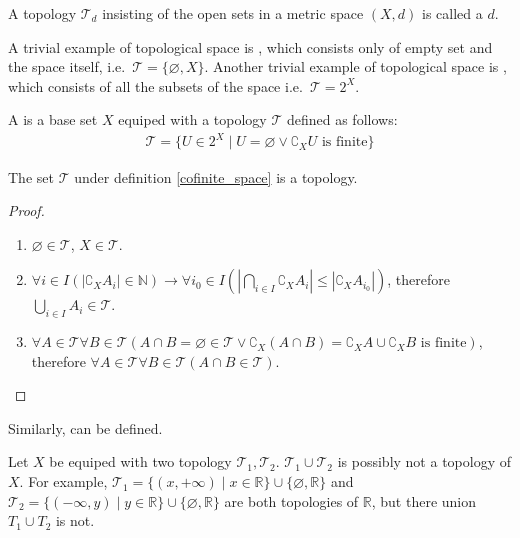 \documentclass[openany]{book}
\begin{document}
\begin{definition}\label{induced_topology}
A topology $\mathscr{T}_d$ insisting of the open sets in a metric space $( X, d)$ is called a  $d$.
\end{definition}

A trivial example of topological space is , which consists only of empty set and the space itself, i.e.\ $\mathscr{T}=\{\varnothing, X\}$. Another trivial example of topological space is , which consists of all the subsets of the space i.e.\ $\mathscr{T} = 2^X$.

A  is a base set $X$ equiped with a topology $\mathscr{T}$ defined as follows:
\begin{align}\label{cofinite_space}
	\mathscr{T} = \{ U\in 2^X\mid U=\varnothing \vee \complement_X U \text{ is finite} \}
\end{align}
\begin{proposition}
The set $\mathscr{T}$ under definition \ref{cofinite_space} is a topology.
\end{proposition}
\begin{proof}
\begin{enumerate}[label=\alph*)]
\item $\varnothing \in \mathscr{T}$, $X\in\mathscr T$.
\item $\forall i \in I \left(
	\left|\complement_X  A_i\right| \in \mathbb N\right) \to
		\forall i_0\in I\left(
			\left| \bigcap_{i\in I} \complement_X A_i\right| \leq 
				\left|\complement_X A_{i_0}\right|\right)$, therefore $\bigcup_{i\in I}  A_i \in \mathscr T$.
\item $\forall A\in \mathscr T \forall B \in \mathscr T(
	A\cap B=\varnothing\in \mathscr{T} \vee
		\complement_X (A\cap B) = \complement_X A\cup \complement_X B \text{ is finite} )$, 
	therefore $\forall A\in \mathscr T \forall B \in \mathscr T(
		A\cap B \in \mathscr T)$.
\end{enumerate}
\end{proof}

Similarly,  can be defined.

Let $X$ be equiped with two topology $\mathscr T_1, \mathscr T_2$. $\mathscr T_1\cup \mathscr T_2$ is possibly not a topology of $X$. For example, $\mathscr T _1 = \{ (x,+\infty) \mid x\in\mathbb R\}\cup\{ \varnothing,\mathbb R\}$ and $\mathscr T_2 = \{ (-\infty, y) \mid y\in\mathbb R\}\cup\{ \varnothing,\mathbb R\}$ are both topologies of $\mathbb R$, but there union $T_1\cup T_2$ is not. 
\end{document}
